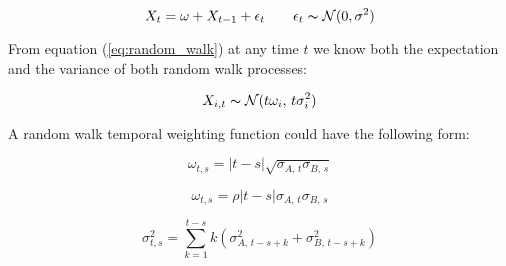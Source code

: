 \documentclass[12pt]{article}
\begin{document}
\begin{equation} \label{eq:random_walk}
    X_{t} = \omega + X_{t-1} + \epsilon_{t} \qquad \epsilon_{t} \thicksim \mathcal{N}(0, \sigma^{2})
\end{equation}

From equation (\ref{eq:random_walk}) at any time $t$ we know both the expectation and the variance of both random walk processes:

\begin{equation}
    X_{i,t} \thicksim \mathcal{N}(t\omega_{i}, \, t\sigma_{i}^{2})
\end{equation}

A random walk temporal weighting function could have the following form:

\begin{equation}
    \omega_{t, s} = \lvert t - s \rvert \sqrt{ \sigma_{A,\, t} \sigma_{B,\, s} }
\end{equation}

\begin{equation}
    \omega_{t, s} = \rho \lvert t - s \rvert \sigma_{A,\, t} \sigma_{B,\, s}
\end{equation}

\begin{equation}
    \sigma^{2}_{t, s} = \sum_{k=1}^{t - s} k \left( \sigma^{2}_{A,\, t - s + k} + \sigma^{2}_{B,\, t - s + k} \right)
\end{equation}
\end{document}
